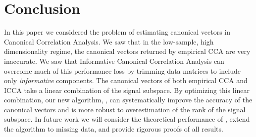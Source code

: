 \section{Conclusion}\label{sec:chpt5:conc}

In this paper we considered the problem of estimating canonical vectors in Canonical
Correlation Analysis. We saw that in the low-sample, high dimensionality regime, the
canonical vectors returned by empirical CCA are very inaccurate. We saw that Informative
Canonical Correlation Analysis can overcome much of this performance loss by trimming data
matrices to include only \textit{informative} components. The canonical vectors of both
empirical CCA and ICCA take a linear combination of the signal subspace. By optimizing
this linear combination, our new algorithm, \iccaps, can systematically improve the
accuracy of the canonical vectors and is more robust to overestimation of the rank of the
signal subspace. In future work we will consider the theoretical performance of \iccaps,
extend the algorithm to missing data, and provide rigorous proofs of all results.
